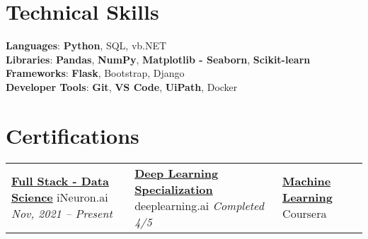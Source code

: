 \documentclass[letterpaper,11pt]{article}
\begin{document}
\section{Technical Skills}
 \begin{itemize}[leftmargin=0.15in, label={}]
    \small{\item{
     \textbf{Languages}{: {\bfseries{Python}}, 
                          {SQL}, 
                          {vb.NET}} \\
     \textbf{Libraries}{: {\bfseries{Pandas}}, 
                          {\bfseries{NumPy}},
                          {\bfseries{Matplotlib - Seaborn}},
                          {\bfseries{Scikit-learn}}}\\
     \textbf{Frameworks}{: {\bfseries{Flask}},
                          {Bootstrap},
                          {Django}} \\
     \textbf{Developer Tools}{: 
                          {\bfseries{Git}},
                          {\bfseries{VS Code}},
                          {\bfseries{UiPath}}, 
                          {Docker}} \\
    }}
 \end{itemize}

\section{Certifications}
 \begin{itemize}[leftmargin=0.15in, label={}]

\begin{tabularx}{\linewidth}{ @{} X X X @{} }
    \href{https://ineuron.ai/course/Full-Stack-Data-Science-Nov'21-Batch}
    {\bfseries{Full Stack - Data Science}}\hfill \break
    iNeuron.ai\hfill \break
    {\textit{Nov, 2021 -- Present}}

    &
    
    \href{https://drive.google.com/file/d/1nlAGjIDLMqbXyDVl-Py22eLMO2MyzlGz/view?usp=sharing}
    {\bfseries{Deep Learning Specialization}}\hfill \break
    deeplearning.ai\hfill \break
    {\textit{Completed 4/5}}

    &
    
    \href{https://www.coursera.org/learn/machine-learning}
    {\bfseries{Machine Learning}}\hfill \break
    Coursera
\end{tabularx}
 \end{itemize}

\end{document}
